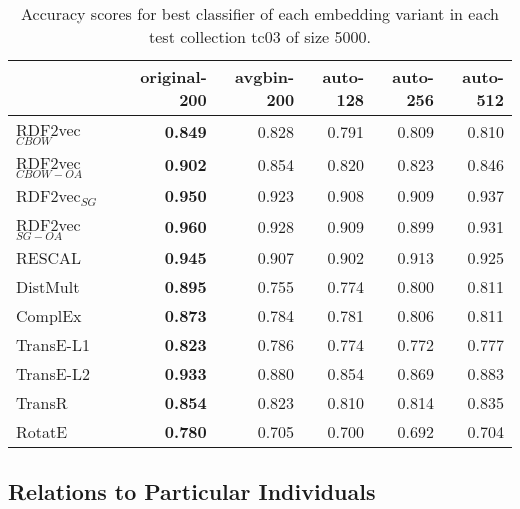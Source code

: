 \documentclass[11pt,titlepage,oneside,openany]{book}
\begin{document}
\begin{table}[h!]
\centering
\begin{tabular}{lrrrrr}
\toprule
{} &  original-200 &  avgbin-200 &  auto-128 &  auto-256 &  auto-512 \\
\midrule
RDF2vec$_{CBOW}$     &	\textbf{0.849} &       0.828  &     0.791  &     0.809  &     0.810  \\
RDF2vec$_{CBOW-OA}$  &	\textbf{0.902} &       0.854  &     0.820  &     0.823  &     0.846  \\
RDF2vec$_{SG}$       &	\textbf{0.950} &       0.923  &     0.908  &     0.909  &     0.937  \\
RDF2vec$_{SG-OA}$    &	\textbf{0.960} &       0.928  &     0.909  &     0.899  &     0.931  \\
RESCAL               &	\textbf{0.945} &       0.907  &     0.902  &     0.913  &     0.925  \\
DistMult             &	\textbf{0.895} &       0.755  &     0.774  &     0.800  &     0.811  \\
ComplEx              &	\textbf{0.873} &       0.784  &     0.781  &     0.806  &     0.811  \\
TransE-L1            &	\textbf{0.823} &       0.786  &     0.774  &     0.772  &     0.777  \\
TransE-L2            &	\textbf{0.933} &       0.880  &     0.854  &     0.869  &     0.883  \\
TransR               &	\textbf{0.854} &       0.823  &     0.810  &     0.814  &     0.835  \\
RotatE               &	\textbf{0.780} &       0.705  &     0.700  &     0.692  &     0.704  \\
\bottomrule
\end{tabular}
\caption{Accuracy scores for best classifier of each embedding variant in each test collection tc03 of size 5000.}
\label{tab:dlcc-acc-tc03-5000}
\end{table}

\newpage

\subsection{Relations to Particular Individuals}
\label{subsec:dlcc-results-tc04-tc05}
\end{document}
